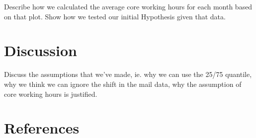 \documentclass{article}
\begin{document}
Describe how we calculated the average core working hours for each month based
on that plot. Show how we tested our initial Hypothesis given that data.

\section{Discussion}
Discuss the assumptions that we've made, ie. why we can use the 25/75 quantile,
why we think we can ignore the shift in the mail data, why the assumption of
core working hours is justified.

\section{References}


\end{document}
